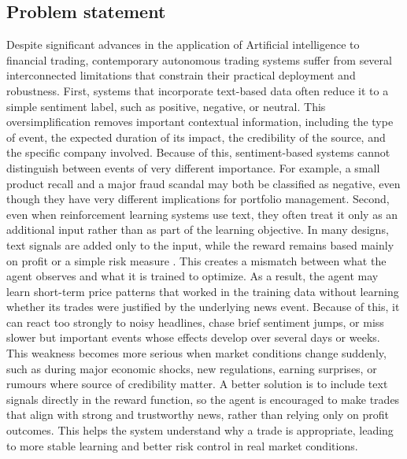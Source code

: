 \documentclass[a4paper,fleqn]{cas-sc}
\begin{document}
\subsection{Problem statement}\label{sec:problem}
Despite significant advances in the application of Artificial intelligence to financial trading, contemporary autonomous trading systems suffer from several interconnected limitations that constrain their practical deployment and robustness. 
First, systems that incorporate text-based data often reduce it to a simple sentiment label, such as positive, negative, or neutral. This oversimplification removes important contextual information, including the type of event, the expected duration of its impact, the credibility of the source, and the specific company involved. Because of this, sentiment-based systems cannot distinguish between events of very different importance. For example, a small product recall and a major fraud scandal may both be classified as negative, even though they have very different implications for portfolio management. 
Second, even when reinforcement learning systems use text, they often treat it only as an additional input rather than as part of the learning objective. In many designs, text signals are added only to the input, while the reward remains based mainly on profit or a simple risk measure \cite{botunac2025automated}. This creates a mismatch between what the agent observes and what it is trained to optimize. As a result, the agent may learn short-term price patterns that worked in the training data without learning whether its trades were justified by the underlying news event. Because of this, it can react too strongly to noisy headlines, chase brief sentiment jumps, or miss slower but important events whose effects develop over several days or weeks. This weakness becomes more serious when market conditions change suddenly, such as during major economic shocks, new regulations, earning surprises, or rumours where source of credibility matter. A better solution is to include text signals directly in the reward function, so the agent is encouraged to make trades that align with strong and trustworthy news, rather than relying only on profit outcomes. This helps the system understand why a trade is appropriate, leading to more stable learning and better risk control in real market conditions. 
\end{document}

